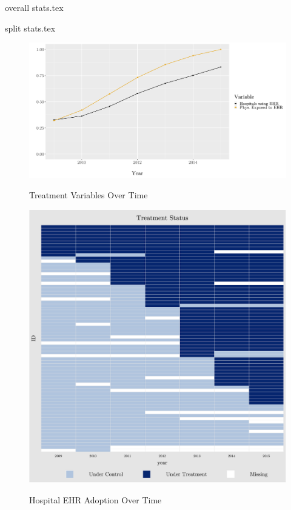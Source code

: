 \documentclass[11pt]{article}
\begin{document}
{overall stats.tex}

{split stats.tex}

\begin{figure}[p]
\centering
    \caption{Treatment Variables Over Time}
    \includegraphics[scale=.55]{Objects/sum_stats_year.pdf}
    \label{fig:treatmentgraph}
\end{figure}

\begin{figure}
    \centering
    \caption{Hospital EHR Adoption Over Time}
    \includegraphics[scale=.8]{Objects/hosp_treat.pdf}
    \label{fig:hosp_treat}
\end{figure}
\end{document}
